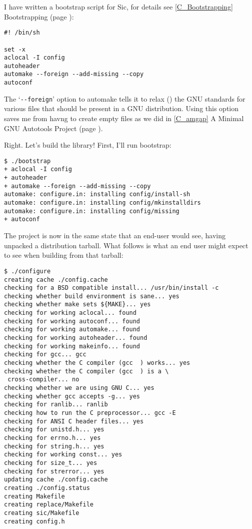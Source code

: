 I have written a bootstrap script for Sic, for details 
see \ref{C_Bootstrapping} Bootstrapping (page \pageref{C_Bootstrapping}):

\begin{Verbatim}[frame=single]
#! /bin/sh

set -x
aclocal -I config
autoheader
automake --foreign --add-missing --copy
autoconf
\end{Verbatim}

The `\verb+--foreign+' option to automake tells it to relax ({\MbQ{}}) the GNU 
standards for various files that should be present in a GNU distribution.
Using this option saves me from havng to create empty files as we did 
in \ref{C_amgap} A Minimal GNU Autotools Project (page \pageref{C_amgap}). 


Right. Let's build the library! First, I'll run bootstrap: 
\begin{Verbatim}[frame=single]
$ ./bootstrap
+ aclocal -I config
+ autoheader
+ automake --foreign --add-missing --copy
automake: configure.in: installing config/install-sh
automake: configure.in: installing config/mkinstalldirs
automake: configure.in: installing config/missing
+ autoconf
\end{Verbatim}

The project is now in the same state that an end-user would see, having 
unpacked a distribution tarball. What follows is what an end user might 
expect to see when building from that tarball: 

\begin{Verbatim}[frame=single]
$ ./configure
creating cache ./config.cache
checking for a BSD compatible install... /usr/bin/install -c
checking whether build environment is sane... yes
checking whether make sets ${MAKE}... yes
checking for working aclocal... found
checking for working autoconf... found
checking for working automake... found
checking for working autoheader... found
checking for working makeinfo... found
checking for gcc... gcc
checking whether the C compiler (gcc  ) works... yes
checking whether the C compiler (gcc  ) is a \
 cross-compiler... no
checking whether we are using GNU C... yes
checking whether gcc accepts -g... yes
checking for ranlib... ranlib
checking how to run the C preprocessor... gcc -E
checking for ANSI C header files... yes
checking for unistd.h... yes
checking for errno.h... yes
checking for string.h... yes
checking for working const... yes
checking for size_t... yes
checking for strerror... yes
updating cache ./config.cache
creating ./config.status
creating Makefile
creating replace/Makefile
creating sic/Makefile
creating config.h
\end{Verbatim}

